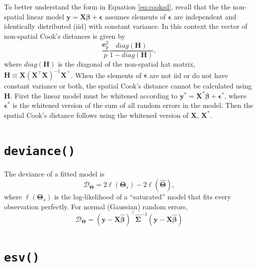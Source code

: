 \documentclass{article}
\begin{document}
To better understand the form in Equation \ref{eq:cooksd}, recall that
the the non-spatial linear model
\(\mathbf{y} = \mathbf{X} \boldsymbol{\beta} + \boldsymbol{\epsilon}\)
assumes elements of \(\boldsymbol{\epsilon}\) are independent and
identically distributed (iid) with constant variance. In this context
the vector of non-spatial Cook's distances is given by \begin{equation*}
\frac{\mathbf{e}_p^2}{p}\frac{diag(\mathbf{H})}{1 - diag(\mathbf{H})},
\end{equation*} where \(diag(\mathbf{H})\) is the diagonal of the
non-spatial hat matrix,
\(\mathbf{H} \equiv \mathbf{X} (\mathbf{X}^{\top} \mathbf{X})^{-1} \mathbf{X}^{\top}\).
When the elements of \(\boldsymbol{\epsilon}\) are not iid or do not
have constant variance or both, the spatial Cook's distance cannot be
calculated using \(\mathbf{H}\). First the linear model must be whitened
according to
\(\mathbf{y}^* = \mathbf{X}^* \boldsymbol{\beta} + \boldsymbol{\epsilon}^*\),
where \(\boldsymbol{\epsilon}^*\) is the whitened version of the sum of
all random errors in the model. Then the spatial Cook's distance follows
using the whitened version of \(\mathbf{X}\), \(\mathbf{X}^*\).

\hypertarget{sec:deviance}{%
\section{\texorpdfstring{\texttt{deviance()}}{deviance()}}\label{sec:deviance}}

The deviance of a fitted model is \begin{equation*}
\mathcal{D}_{\boldsymbol{\Theta}} = 2\ell(\boldsymbol{\Theta}_s) - 2\ell(\boldsymbol{\hat{\Theta}}),
\end{equation*} where \(\ell(\boldsymbol{\Theta}_s)\) is the
log-likelihood of a ``saturated'' model that fits every observation
perfectly. For normal (Gaussian) random errors, \begin{equation*}
\mathcal{D}_{\boldsymbol{\Theta}} = (\mathbf{y} - \mathbf{X} \hat{\boldsymbol{\beta}})^\top \hat{\boldsymbol{\Sigma}}^{-1} (\mathbf{y} - \mathbf{X} \hat{\boldsymbol{\beta}})
\end{equation*}

\hypertarget{sec:esv}{%
\section{\texorpdfstring{\texttt{esv()}}{esv()}}\label{sec:esv}}
\end{document}
